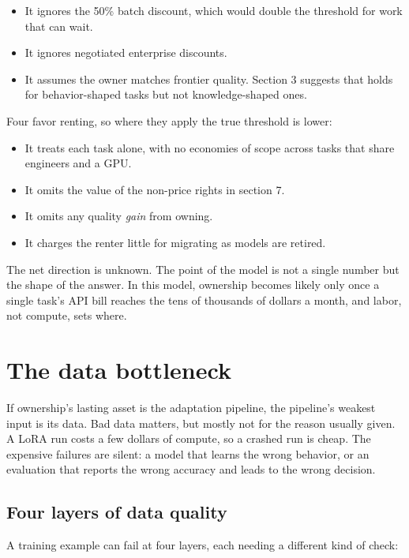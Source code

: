 \begin{itemize}
\tightlist
\item
  It ignores the 50\% batch discount, which would double the threshold for work that can wait.
\item
  It ignores negotiated enterprise discounts.
\item
  It assumes the owner matches frontier quality. Section 3 suggests that holds for behavior-shaped tasks but not knowledge-shaped ones.
\end{itemize}

Four favor renting, so where they apply the true threshold is lower:

\begin{itemize}
\tightlist
\item
  It treats each task alone, with no economies of scope across tasks that share engineers and a GPU.
\item
  It omits the value of the non-price rights in section 7.
\item
  It omits any quality \emph{gain} from owning.
\item
  It charges the renter little for migrating as models are retired.
\end{itemize}

The net direction is unknown. The point of the model is not a single number but the shape of the answer. In this model, ownership becomes likely only once a single task's API bill reaches the tens of thousands of dollars a month, and labor, not compute, sets where.

\section{The data bottleneck}\label{sec:data}

If ownership's lasting asset is the adaptation pipeline, the pipeline's weakest input is its data. Bad data matters, but mostly not for the reason usually given. A LoRA run costs a few dollars of compute, so a crashed run is cheap. The expensive failures are silent: a model that learns the wrong behavior, or an evaluation that reports the wrong accuracy and leads to the wrong decision.

\subsection{Four layers of data quality}

A training example can fail at four layers, each needing a different kind of check:

